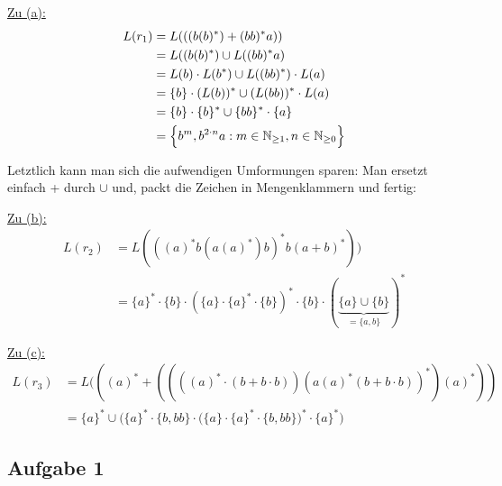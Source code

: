 \begin{lösung}
	\underline{Zu (a):}
	\begin{align*}
		L(r_1)
		&=L(((b(b)^\ast)+(bb)^\ast a))\\
		&=L((b(b)^\ast)\cup L((bb)^\ast a)\\
		&=L(b)\cdot L(b^\ast)\cup L((bb)^\ast)\cdot L(a)\\
		&=\lbrace b\rbrace\cdot (L(b))^\ast\cup(L(bb))^\ast\cdot L(a)\\
		&=\lbrace b\rbrace\cdot\lbrace b\rbrace^\ast\cup\lbrace bb\rbrace^\ast\cdot\lbrace a\rbrace\\
		&=\Big\lbrace b^m, b^{2\cdot n}a:m\in\mathbb{N}_{\geq1},n\in\mathbb{N}_{\geq0}\Big\rbrace
	\end{align*}
	
	Letztlich kann man sich die aufwendigen Umformungen sparen: Man ersetzt einfach + durch $\cup$ und, packt die Zeichen in Mengenklammern und fertig:
		
	\underline{Zu (b):}
	\begin{align*}
		L(r_2)&=L(((a)^\ast b(a(a)^\ast)b)^\ast b(a+b)^\ast))\\
		&=\lbrace a\rbrace^\ast\cdot\lbrace b\rbrace\cdot(\lbrace a\rbrace\cdot\lbrace a\rbrace^\ast\cdot\lbrace b \rbrace)^\ast\cdot\lbrace b\rbrace\cdot(\underbrace{\lbrace a\rbrace\cup\lbrace b\rbrace}_{=\lbrace a,b\rbrace})^\ast
	\end{align*}
	
	\underline{Zu (c):}
	\begin{align*}
		L(r_3)&=L(((a)^\ast+((((a)^\ast\cdot(b+b\cdot b))(a(a)^\ast(b+b\cdot b))^\ast)(a)^\ast))\\
		&=\lbrace a\rbrace^\ast\cup\Big(\lbrace a\rbrace^\ast\cdot\lbrace b,bb\rbrace\cdot\big(\lbrace a\rbrace\cdot\lbrace a\rbrace^\ast\cdot\lbrace b,bb\rbrace\big)^\ast\cdot\lbrace a\rbrace^\ast\Big)
	\end{align*}
\end{lösung}

\subsection{Aufgabe 1}

